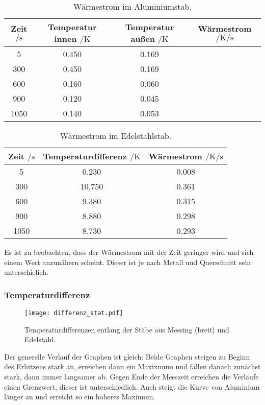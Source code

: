   \begin{table}
    \centering
    \caption{Wärmestrom im Aluminiumstab.}
    \label{tabl:strom}
    \begin{tabular}{c c c c}
      \toprule
      Zeit $\mathbin{/} \si{\s}$ & Temperatur innen $\mathbin{/} \si{\kelvin}$& Temperatur außen $\mathbin{/} \si{\kelvin}$& Wärmestrom $\mathbin{/} \si{\kelvin\per\s}$\\
      \midrule
      5 & 0.450 & 0.169\\
      300 & 0.450 & 0.169\\
      600 & 0.160 & 0.060\\
      900 & 0.120 & 0.045\\
      1050 & 0.140 & 0.053\\
      \bottomrule
    \end{tabular}
  \end{table}

  \begin{table}
    \centering
    \caption{Wärmestrom im Edelstahlstab.}
    \label{tabl:strom}
    \begin{tabular}{c c c}
      \toprule
      Zeit $\mathbin{/} \si{\s}$ & Temperaturdifferenz $\mathbin{/} \si{\kelvin}$& Wärmestrom $\mathbin{/} \si{\kelvin\per\s}$\\
      \midrule
      5 & 0.230& 0.008\\
      300 & 10.750 & 0.361 \\
      600 & 9.380 & 0.315\\
      900 & 8.880 & 0.298\\%
      1050 & 8.730 & 0.293\\%
      \bottomrule
    \end{tabular}
  \end{table}
  \FloatBarrier
  \noindent Es ist zu beobachten, dass der Wärmestrom mit der Zeit geringer wird und sich einem Wert anzunähern scheint. Dieser ist je nach Metall und Querschnitt 
  sehr unterschielich. %

  \subsubsection{Temperaturdifferenz}


  \begin{figure}
    \centering
    \texttt{[image: differenz\_stat.pdf]}
    \caption{Temperaturdifferenzen entlang der Stäbe aus Messing (breit) und Edelstahl.}
    \label{fig:diffstat}
  \end{figure}
  \FloatBarrier
  \noindent Der generelle Verlauf der Graphen ist gleich: 
  Beide Graphen steigen zu Beginn des Erhitzens stark an, erreichen dann ein Maxixmum 
  und fallen danach zunächst stark, dann immer langsamer ab. Gegen Ende der Messzeit erreichen 
  die Verläufe einen Grenzwert, dieser ist unterschiedlich. Auch steigt die Kurve von Aluminium 
  länger an und erreicht so ein höheres Maximum. \\


